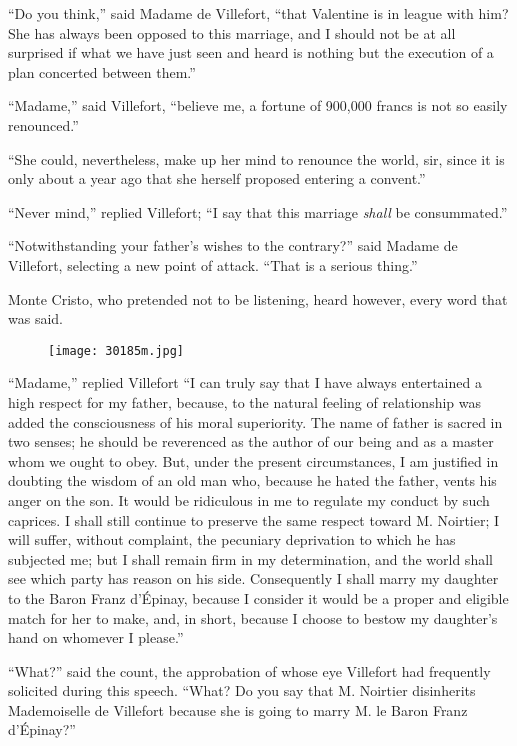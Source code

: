 “Do you think,” said Madame de Villefort, “that Valentine is in league
with him? She has always been opposed to this marriage, and I should
not be at all surprised if what we have just seen and heard is nothing
but the execution of a plan concerted between them.”

“Madame,” said Villefort, “believe me, a fortune of 900,000 francs is
not so easily renounced.”

“She could, nevertheless, make up her mind to renounce the world, sir,
since it is only about a year ago that she herself proposed entering a
convent.”

“Never mind,” replied Villefort; “I say that this marriage \textit{shall} be
consummated.”

“Notwithstanding your father’s wishes to the contrary?” said Madame de
Villefort, selecting a new point of attack. “That is a serious thing.”

Monte Cristo, who pretended not to be listening, heard however, every
word that was said.

\begin{figure}[ht]
\texttt{[image: 30185m.jpg]}
\end{figure}

“Madame,” replied Villefort “I can truly say that I have always
entertained a high respect for my father, because, to the natural
feeling of relationship was added the consciousness of his moral
superiority. The name of father is sacred in two senses; he should be
reverenced as the author of our being and as a master whom we ought to
obey. But, under the present circumstances, I am justified in doubting
the wisdom of an old man who, because he hated the father, vents his
anger on the son. It would be ridiculous in me to regulate my conduct
by such caprices. I shall still continue to preserve the same respect
toward M. Noirtier; I will suffer, without complaint, the pecuniary
deprivation to which he has subjected me; but I shall remain firm in my
determination, and the world shall see which party has reason on his
side. Consequently I shall marry my daughter to the Baron Franz
d’Épinay, because I consider it would be a proper and eligible match
for her to make, and, in short, because I choose to bestow my
daughter’s hand on whomever I please.”

“What?” said the count, the approbation of whose eye Villefort had
frequently solicited during this speech. “What? Do you say that M.
Noirtier disinherits Mademoiselle de Villefort because she is going to
marry M. le Baron Franz d’Épinay?”

